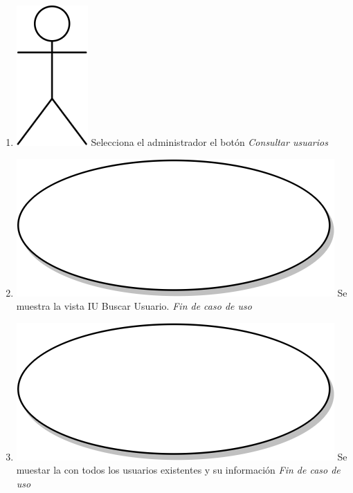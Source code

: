 \begin{enumerate}
  \item {\includegraphics[scale=.1]{Capitulo3/img/actor.png} Selecciona el administrador el botón \textit{Consultar usuarios}}
  \item {\includegraphics[scale=.05]{Capitulo3/img/proceso.png} Se muestra la vista IU Buscar Usuario.}
  \textit{Fin de caso de uso} \\  
  \item {\includegraphics[scale=.05]{Capitulo3/img/proceso.png} Se muestar la con todos los usuarios existentes y su información}
  \textit{Fin de caso de uso} \\  
\end{enumerate}


